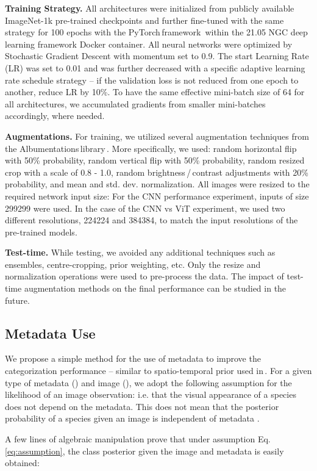 \documentclass[10pt,twocolumn,letterpaper]{article}
\begin{document}
\textbf{Training Strategy.} All architectures were initialized from publicly available ImageNet-1k pre-trained checkpoints and further fine-tuned with the same strategy for 100 epochs with the PyTorch\,framework\,\cite{PyTorch} within the 21.05 NGC deep learning framework Docker container. All neural networks were optimized by Stochastic Gradient Descent with momentum set to 0.9. The start Learning Rate (LR) was set to 0.01 and was further decreased with a specific adaptive learning rate schedule strategy -- if the validation loss is not reduced from one epoch to another, reduce LR by 10\%. To have the same effective mini-batch size of 64 for all architectures, we accumulated gradients from smaller mini-batches accordingly, where needed.

\textbf{Augmentations.} For training, we utilized several augmentation techniques from the Albumentations\,library\,\cite{albumentation}. More specifically, we used: random horizontal flip with 50\% probability, random vertical flip with 50\% probability, random resized crop with a scale of 0.8 - 1.0, random brightness\,/\,contrast adjustments with 20\% probability, and mean and std. dev. normalization. All images were resized to the required network input size: For the CNN performance experiment, inputs of size 299299 were used. In the case of the CNN vs ViT experiment, we used two different resolutions, 224224 and 384384, to match the input resolutions of the pre-trained models.

\textbf{Test-time.} While testing, we avoided any additional techniques such as ensembles, centre-cropping, prior weighting, etc. Only the resize and normalization operations were used to pre-process the data. The impact of test-time augmentation methods on the final performance can be studied in the future.

\subsection{Metadata Use}
\label{metadata_usage}
We propose a simple method for the use of metadata to improve the categorization performance -- similar to spatio-temporal prior used in\,\cite{dataset-birdsnap}.
For a given type of metadata () and image (), we adopt the following assumption for the likelihood of an image observation: 
i.e. that the visual appearance of a species does not depend on the metadata.
This does not mean that the posterior probability of a species given an image is independent of metadata .


A few lines of algebraic manipulation prove that under assumption Eq.\,\eqref{eq:assumption}, the class posterior given the image  and metadata  is easily obtained:
\end{document}
